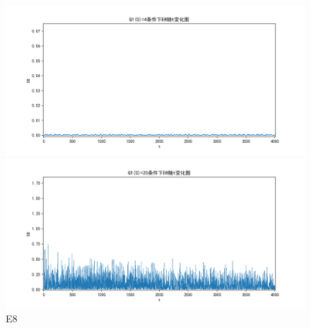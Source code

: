 \documentclass[10pt, a4paper]{article}
\begin{document}
    \begin{figure}[H]
        \begin{minipage}[t]{0.49\textwidth}
            \centering
            \includegraphics[width=\textwidth]{./q5_pics/cmp/E8.png}
        \end{minipage}
        \begin{minipage}[t]{0.49\textwidth}
            \centering
            \includegraphics[width=\textwidth]{./q5_pics/exp/E8.png}
        \end{minipage}
        \caption{E8}\label{fig:E8 in q5}
    \end{figure}
\end{document}
